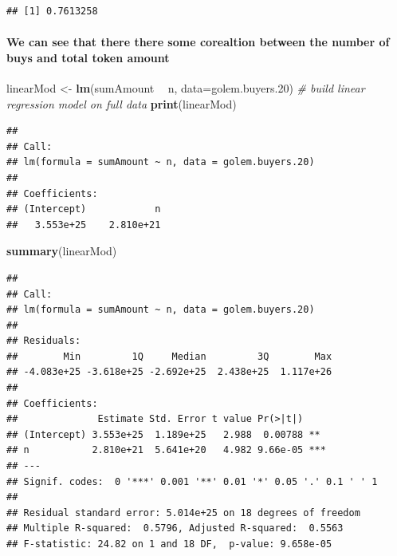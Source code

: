 \documentclass[]{article}
\newenvironment{Shaded}{\begin{snugshade}}{\end{snugshade}}
\newcommand{\KeywordTok}[1]{\textcolor[rgb]{0.13,0.29,0.53}{\textbf{#1}}}
\newcommand{\DataTypeTok}[1]{\textcolor[rgb]{0.13,0.29,0.53}{#1}}
\newcommand{\DecValTok}[1]{\textcolor[rgb]{0.00,0.00,0.81}{#1}}
\newcommand{\StringTok}[1]{\textcolor[rgb]{0.31,0.60,0.02}{#1}}
\newcommand{\CommentTok}[1]{\textcolor[rgb]{0.56,0.35,0.01}{\textit{#1}}}
\newcommand{\OperatorTok}[1]{\textcolor[rgb]{0.81,0.36,0.00}{\textbf{#1}}}
\newcommand{\NormalTok}[1]{#1}
\let\oldparagraph\paragraph
\renewcommand{\paragraph}[1]{\oldparagraph{#1}\mbox{}}
\begin{document}
\begin{Shaded}
\end{Shaded}

\begin{verbatim}
## [1] 0.7613258
\end{verbatim}

\paragraph{We can see that there there some corealtion between the
number of buys and total token
amount}\label{we-can-see-that-there-there-some-corealtion-between-the-number-of-buys-and-total-token-amount}

\begin{Shaded}
\begin{Highlighting}[]
\NormalTok{linearMod <-}\StringTok{ }\KeywordTok{lm}\NormalTok{(sumAmount }\OperatorTok{~}\StringTok{ }\NormalTok{n, }\DataTypeTok{data=}\NormalTok{golem.buyers.}\DecValTok{20}\NormalTok{)  }\CommentTok{# build linear regression model on full data}
\KeywordTok{print}\NormalTok{(linearMod)}
\end{Highlighting}
\end{Shaded}

\begin{verbatim}
## 
## Call:
## lm(formula = sumAmount ~ n, data = golem.buyers.20)
## 
## Coefficients:
## (Intercept)            n  
##   3.553e+25    2.810e+21
\end{verbatim}

\begin{Shaded}
\begin{Highlighting}[]
\KeywordTok{summary}\NormalTok{(linearMod) }
\end{Highlighting}
\end{Shaded}

\begin{verbatim}
## 
## Call:
## lm(formula = sumAmount ~ n, data = golem.buyers.20)
## 
## Residuals:
##        Min         1Q     Median         3Q        Max 
## -4.083e+25 -3.618e+25 -2.692e+25  2.438e+25  1.117e+26 
## 
## Coefficients:
##              Estimate Std. Error t value Pr(>|t|)    
## (Intercept) 3.553e+25  1.189e+25   2.988  0.00788 ** 
## n           2.810e+21  5.641e+20   4.982 9.66e-05 ***
## ---
## Signif. codes:  0 '***' 0.001 '**' 0.01 '*' 0.05 '.' 0.1 ' ' 1
## 
## Residual standard error: 5.014e+25 on 18 degrees of freedom
## Multiple R-squared:  0.5796, Adjusted R-squared:  0.5563 
## F-statistic: 24.82 on 1 and 18 DF,  p-value: 9.658e-05
\end{verbatim}
\end{document}
